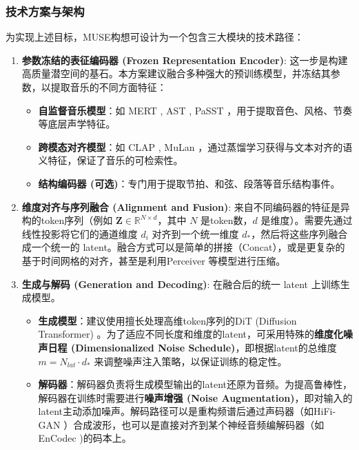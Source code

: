 \documentclass[12pt]{article}
\begin{document}
\subsubsection{技术方案与架构}
为实现上述目标，MUSE构想可设计为一个包含三大模块的技术路径：
\begin{enumerate}
    \item \textbf{参数冻结的表征编码器 (Frozen Representation Encoder)}: 这一步是构建高质量潜空间的基石。本方案建议融合多种强大的预训练模型，并冻结其参数，以提取音乐的不同方面特征：
    \begin{itemize}
        \item \textbf{自监督音乐模型}：如 MERT \cite{li2023mert}, AST \cite{gong2021ast}, PaSST \cite{koutini2022passt}，用于提取音色、风格、节奏等底层声学特征。
        \item \textbf{跨模态对齐模型}：如 CLAP \cite{elizalde2023clap}, MuLan \cite{huang2022mulan}，通过蒸馏学习获得与文本对齐的语义特征，保证了音乐的可检索性。
        \item \textbf{结构编码器 (可选)}：专门用于提取节拍、和弦、段落等音乐结构事件。
    \end{itemize}

    \item \textbf{维度对齐与序列融合 (Alignment and Fusion)}: 来自不同编码器的特征是异构的token序列（例如 \(\mathbf{Z}\in\mathbb{R}^{N\times d}\)，其中 \(N\) 是token数，\(d\) 是维度）。需要先通过线性投影将它们的通道维度 \(d_i\) 对齐到一个统一维度 \(d_*\)，然后将这些序列融合成一个统一的 latent。融合方式可以是简单的拼接（Concat），或是更复杂的基于时间网格的对齐，甚至是利用Perceiver \cite{jaegle2021perceiver}等模型进行压缩。

    \item \textbf{生成与解码 (Generation and Decoding)}: 在融合后的统一 latent 上训练生成模型。
    \begin{itemize}
        \item \textbf{生成模型}：建议使用擅长处理高维token序列的DiT (Diffusion Transformer) \cite{peebles2023scalable}。为了适应不同长度和维度的latent，可采用特殊的\textbf{维度化噪声日程 (Dimensionalized Noise Schedule)}，即根据latent的总维度 \(m=N_{lat}\cdot d_*\) 来调整噪声注入策略，以保证训练的稳定性。
        \item \textbf{解码器}：解码器负责将生成模型输出的latent还原为音频。为提高鲁棒性，解码器在训练时需要进行\textbf{噪声增强 (Noise Augmentation)}，即对输入的latent主动添加噪声。解码路径可以是重构频谱后通过声码器（如HiFi-GAN \cite{kong2020hifi}）合成波形，也可以是直接对齐到某个神经音频编解码器（如EnCodec \cite{defossez2022high})的码本上。
    \end{itemize}
\end{enumerate}
\end{document}
